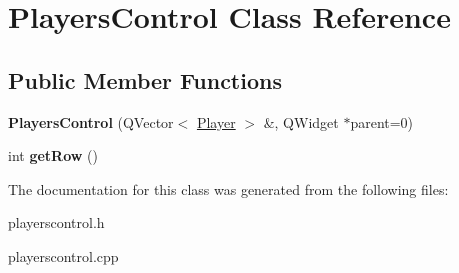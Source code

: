 \hypertarget{classPlayersControl}{\section{Players\-Control Class Reference}
\label{classPlayersControl}
}
\subsection*{Public Member Functions}
\begin{DoxyCompactItemize}
\item 
\hypertarget{classPlayersControl_a593957bc4333b43d2ed2188dca0e5e89}{{\bfseries Players\-Control} (Q\-Vector$<$ \hyperlink{classPlayer}{Player} $>$ \&, Q\-Widget $\ast$parent=0)}\label{classPlayersControl_a593957bc4333b43d2ed2188dca0e5e89}

\item 
\hypertarget{classPlayersControl_afb74e0c42d6a105aa1370a92b3af238a}{int {\bfseries get\-Row} ()}\label{classPlayersControl_afb74e0c42d6a105aa1370a92b3af238a}

\end{DoxyCompactItemize}


The documentation for this class was generated from the following files\-:\begin{DoxyCompactItemize}
\item 
playerscontrol.\-h\item 
playerscontrol.\-cpp\end{DoxyCompactItemize}
